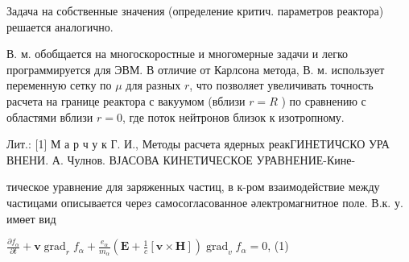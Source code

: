 \documentclass[10pt]{article}
\begin{document}
Задача на собственные значения (определение критич. параметров реактора) решается аналогично.



В. м. обобщается на многоскоростные и многомерные задачи и легко программируется для ЭВМ. В отличие от Карлсона метода, В. м. использует переменную сетку по $\mu$ для разных $r$, что позволяет увеличивать точность расчета на границе реактора с вакуумом (вблизи $r=R$ ) по сравнению с областями вблизи $r=0$, где поток нейтронов близок к изотропному.



Лит.: [1] М а р ч у к Г. И., Методы расчета ядерных реакГИНЕТИЧСКО УРА ВНЕНИ. А. Чулнов. ВЈАСОВА КИНЕТИЧЕСКОЕ УРАВНЕНИЕ-Кине-

тическое уравнение для заряженных частиц, в к-ром взаимодействие между частицами описывается через самосогласованное әлектромагнитное поле. В.к. у. имөет вид



$\frac{\partial f_{\alpha}}{\partial t}+\boldsymbol{v} \operatorname{grad}_{r} f_{\alpha}+\frac{e_{\alpha}}{m_{\alpha}}\left(\boldsymbol{E}+\frac{1}{c}[\boldsymbol{v} \times \boldsymbol{H}]\right) \operatorname{grad}_{v} f_{\alpha}=0$, (1)
\end{document}
